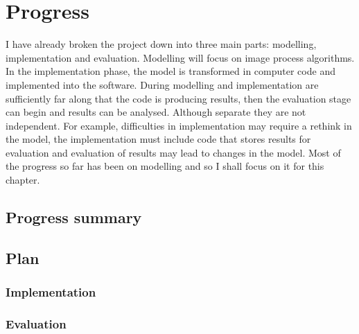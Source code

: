 \chapter{Progress} 

I have already broken the project down into three main parts: modelling, implementation and evaluation. Modelling will focus on image process algorithms. In the implementation phase, the model is transformed in computer code and implemented into the software. During modelling and implementation are sufficiently far along that the code is producing
results, then the evaluation stage can begin and results can be
analysed. Although separate they are not independent. For example, difficulties in implementation may require a rethink in the
model, the implementation must include code that stores results for
evaluation and evaluation of results may lead to changes in the model. Most of the progress so far has been on modelling and so I shall focus
on it for this chapter.


\section{Progress summary} \label{prog:model}


\section{Plan}



\subsection{Implementation}


\subsection{Evaluation}
